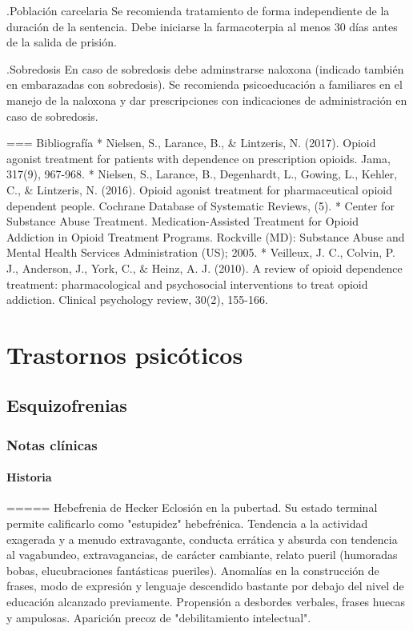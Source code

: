 \documentclass{scrbook}
\begin{document}
.Población carcelaria
Se recomienda tratamiento de forma independiente de la duración de la sentencia.
Debe iniciarse la farmacoterpia al menos 30 días antes de la salida de prisión.

.Sobredosis
En caso de sobredosis debe adminstrarse naloxona (indicado también en embarazadas con sobredosis).
Se recomienda psicoeducación a familiares en el manejo de la naloxona y dar prescripciones con indicaciones de administración en caso de sobredosis.

=== Bibliografía
* Nielsen, S., Larance, B., \& Lintzeris, N. (2017). Opioid agonist treatment for patients with dependence on prescription opioids. Jama, 317(9), 967-968.
* Nielsen, S., Larance, B., Degenhardt, L., Gowing, L., Kehler, C., \& Lintzeris, N. (2016). Opioid agonist treatment for pharmaceutical opioid dependent people. Cochrane Database of Systematic Reviews, (5).
* Center for Substance Abuse Treatment. Medication-Assisted Treatment for Opioid Addiction in Opioid Treatment Programs. Rockville (MD): Substance Abuse and Mental Health Services Administration (US); 2005.
* Veilleux, J. C., Colvin, P. J., Anderson, J., York, C., \& Heinz, A. J. (2010). A review of opioid dependence treatment: pharmacological and psychosocial interventions to treat opioid addiction. Clinical psychology review, 30(2), 155-166.
\part{Trastornos psicóticos}
\chapter{Esquizofrenias}
\section*{Notas clínicas}
\subsection*{Historia}
===== Hebefrenia de Hecker
Eclosión en la pubertad. Su estado terminal permite calificarlo como "estupidez" hebefrénica. Tendencia a la actividad exagerada y a menudo extravagante, conducta errática y absurda con tendencia al vagabundeo, extravagancias, de carácter cambiante, relato pueril (humoradas bobas, elucubraciones fantásticas pueriles). Anomalías en la construcción de frases, modo de expresión y lenguaje descendido bastante por debajo del nivel de educación alcanzado previamente. Propensión a desbordes verbales, frases huecas y ampulosas. Aparición precoz de "debilitamiento intelectual".
\end{document}
